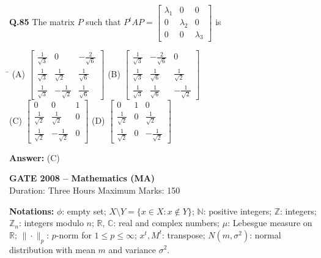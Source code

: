 \documentclass[11pt,a4paper]{article}
\newcommand{\optsfourA}[4]{%
  \begin{tabbing}
    \hspace{0.48\linewidth}\=\kill
    (A) #1 \> (B) #2 \\[2pt]
    (C) #3 \> (D) #4
  \end{tabbing}%
}
\newcommand{\ans}[1]{\textbf{Answer:} #1\par\medskip}
\begin{document}
\textbf{Q.85} The matrix $P$ such that $P^t A P = \begin{bmatrix} \lambda_1 & 0 & 0 \\ 0 & \lambda_2 & 0 \\ 0 & 0 & \lambda_3 \end{bmatrix}$ is
\optsfourA{$\begin{bmatrix} \frac{1}{\sqrt{3}} & 0 & -\frac{2}{\sqrt{6}} \\ \frac{1}{\sqrt{3}} & \frac{1}{\sqrt{2}} & \frac{1}{\sqrt{6}} \\ \frac{1}{\sqrt{3}} & -\frac{1}{\sqrt{2}} & \frac{1}{\sqrt{6}} \end{bmatrix}$}{$\begin{bmatrix} \frac{1}{\sqrt{3}} & -\frac{2}{\sqrt{6}} & 0 \\ \frac{1}{\sqrt{3}} & \frac{1}{\sqrt{6}} & \frac{1}{\sqrt{2}} \\ \frac{1}{\sqrt{3}} & \frac{1}{\sqrt{6}} & -\frac{1}{\sqrt{2}} \end{bmatrix}$}{$\begin{bmatrix} 0 & 0 & 1 \\ \frac{1}{\sqrt{2}} & \frac{1}{\sqrt{2}} & 0 \\ \frac{1}{\sqrt{2}} & -\frac{1}{\sqrt{2}} & 0 \end{bmatrix}$}{$\begin{bmatrix} 0 & 1 & 0 \\ \frac{1}{\sqrt{2}} & 0 & \frac{1}{\sqrt{2}} \\ \frac{1}{\sqrt{2}} & 0 & -\frac{1}{\sqrt{2}} \end{bmatrix}$}
\ans{(C)}

\newpage


\begin{center}
  {\Large\bfseries GATE 2008 -- Mathematics (MA)}\\[4pt]
  {\small Duration: Three Hours \quad\textbar\quad Maximum Marks: 150}
\end{center}

\medskip
\textbf{Notations:} $\phi$: empty set; $X \setminus Y = \{x \in X : x \notin Y\}$; $\mathbb{N}$: positive integers; $\mathbb{Z}$: integers; $\mathbb{Z}_n$: integers modulo $n$; $\mathbb{R}$, $\mathbb{C}$: real and complex numbers; $\mu$: Lebesgue measure on $\mathbb{R}$; $\|\cdot\|_p$: $p$-norm for $1 \le p \le \infty$; $x^t, M^t$: transpose; $N(m, \sigma^2)$: normal distribution with mean $m$ and variance $\sigma^2$.
\end{document}
